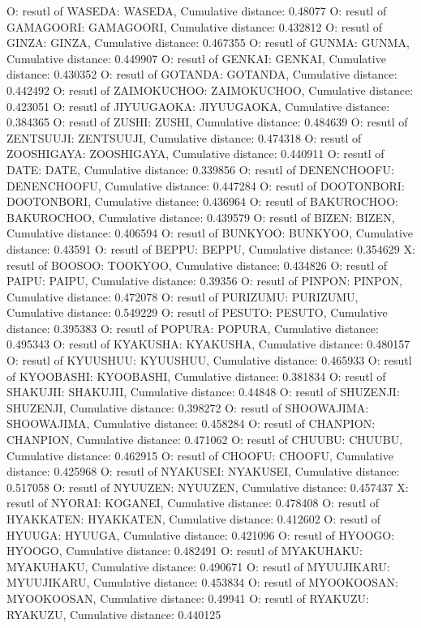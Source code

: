 O: resutl of WASEDA: WASEDA, Cumulative distance: 0.48077
O: resutl of GAMAGOORI: GAMAGOORI, Cumulative distance: 0.432812
O: resutl of GINZA: GINZA, Cumulative distance: 0.467355
O: resutl of GUNMA: GUNMA, Cumulative distance: 0.449907
O: resutl of GENKAI: GENKAI, Cumulative distance: 0.430352
O: resutl of GOTANDA: GOTANDA, Cumulative distance: 0.442492
O: resutl of ZAIMOKUCHOO: ZAIMOKUCHOO, Cumulative distance: 0.423051
O: resutl of JIYUUGAOKA: JIYUUGAOKA, Cumulative distance: 0.384365
O: resutl of ZUSHI: ZUSHI, Cumulative distance: 0.484639
O: resutl of ZENTSUUJI: ZENTSUUJI, Cumulative distance: 0.474318
O: resutl of ZOOSHIGAYA: ZOOSHIGAYA, Cumulative distance: 0.440911
O: resutl of DATE: DATE, Cumulative distance: 0.339856
O: resutl of DENENCHOOFU: DENENCHOOFU, Cumulative distance: 0.447284
O: resutl of DOOTONBORI: DOOTONBORI, Cumulative distance: 0.436964
O: resutl of BAKUROCHOO: BAKUROCHOO, Cumulative distance: 0.439579
O: resutl of BIZEN: BIZEN, Cumulative distance: 0.406594
O: resutl of BUNKYOO: BUNKYOO, Cumulative distance: 0.43591
O: resutl of BEPPU: BEPPU, Cumulative distance: 0.354629
X: resutl of BOOSOO: TOOKYOO, Cumulative distance: 0.434826
O: resutl of PAIPU: PAIPU, Cumulative distance: 0.39356
O: resutl of PINPON: PINPON, Cumulative distance: 0.472078
O: resutl of PURIZUMU: PURIZUMU, Cumulative distance: 0.549229
O: resutl of PESUTO: PESUTO, Cumulative distance: 0.395383
O: resutl of POPURA: POPURA, Cumulative distance: 0.495343
O: resutl of KYAKUSHA: KYAKUSHA, Cumulative distance: 0.480157
O: resutl of KYUUSHUU: KYUUSHUU, Cumulative distance: 0.465933
O: resutl of KYOOBASHI: KYOOBASHI, Cumulative distance: 0.381834
O: resutl of SHAKUJII: SHAKUJII, Cumulative distance: 0.44848
O: resutl of SHUZENJI: SHUZENJI, Cumulative distance: 0.398272
O: resutl of SHOOWAJIMA: SHOOWAJIMA, Cumulative distance: 0.458284
O: resutl of CHANPION: CHANPION, Cumulative distance: 0.471062
O: resutl of CHUUBU: CHUUBU, Cumulative distance: 0.462915
O: resutl of CHOOFU: CHOOFU, Cumulative distance: 0.425968
O: resutl of NYAKUSEI: NYAKUSEI, Cumulative distance: 0.517058
O: resutl of NYUUZEN: NYUUZEN, Cumulative distance: 0.457437
X: resutl of NYORAI: KOGANEI, Cumulative distance: 0.478408
O: resutl of HYAKKATEN: HYAKKATEN, Cumulative distance: 0.412602
O: resutl of HYUUGA: HYUUGA, Cumulative distance: 0.421096
O: resutl of HYOOGO: HYOOGO, Cumulative distance: 0.482491
O: resutl of MYAKUHAKU: MYAKUHAKU, Cumulative distance: 0.490671
O: resutl of MYUUJIKARU: MYUUJIKARU, Cumulative distance: 0.453834
O: resutl of MYOOKOOSAN: MYOOKOOSAN, Cumulative distance: 0.49941
O: resutl of RYAKUZU: RYAKUZU, Cumulative distance: 0.440125
